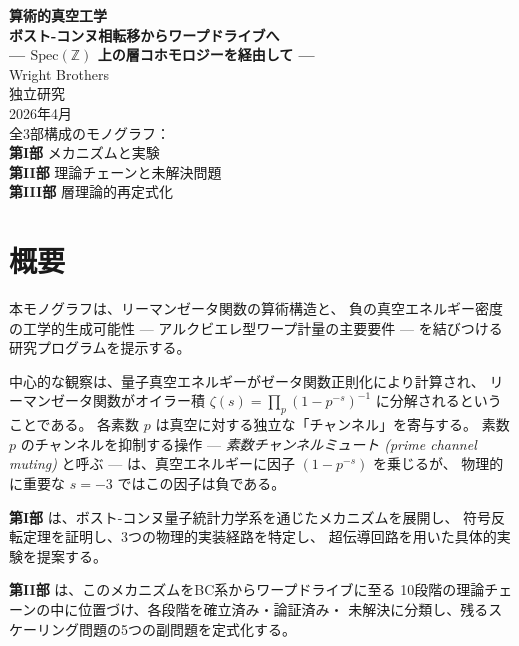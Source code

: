 \documentclass[11pt,a4paper]{article}
\newcommand{\Spec}{\mathrm{Spec}}
\begin{document}
\begin{titlepage}
\centering
\vspace*{3cm}
{\Huge\bfseries 算術的真空工学\\[0.5cm]
\Large ボスト-コンヌ相転移からワープドライブへ\\[0.3cm]
--- $\Spec(\mathbb{Z})$ 上の層コホモロジーを経由して ---\\[2cm]}
{\Large Wright Brothers\\[0.5cm]}
{\large 独立研究\\[1cm]}
{\large 2026年4月\\[3cm]}
{\normalsize
全3部構成のモノグラフ：\\[0.5cm]
\textbf{第I部} メカニズムと実験\\
\textbf{第II部} 理論チェーンと未解決問題\\
\textbf{第III部} 層理論的再定式化\\[2cm]
}
\vfill
\end{titlepage}

\tableofcontents
\newpage


\section*{概要}

本モノグラフは、リーマンゼータ関数の算術構造と、
負の真空エネルギー密度の工学的生成可能性
--- アルクビエレ型ワープ計量の主要要件 ---
を結びつける研究プログラムを提示する。

中心的な観察は、量子真空エネルギーがゼータ関数正則化により計算され、
リーマンゼータ関数がオイラー積
$\zeta(s) = \prod_p (1 - p^{-s})^{-1}$
に分解されるということである。
各素数 $p$ は真空に対する独立な「チャンネル」を寄与する。
素数 $p$ のチャンネルを抑制する操作 ---
\emph{素数チャンネルミュート (prime channel muting)} と呼ぶ ---
は、真空エネルギーに因子 $(1 - p^{-s})$ を乗じるが、
物理的に重要な $s = -3$ ではこの因子は負である。

\textbf{第I部} は、ボスト-コンヌ量子統計力学系を通じたメカニズムを展開し、
符号反転定理を証明し、3つの物理的実装経路を特定し、
超伝導回路を用いた具体的実験を提案する。

\textbf{第II部} は、このメカニズムをBC系からワープドライブに至る
10段階の理論チェーンの中に位置づけ、各段階を確立済み・論証済み・
未解決に分類し、残るスケーリング問題の5つの副問題を定式化する。
\end{document}
